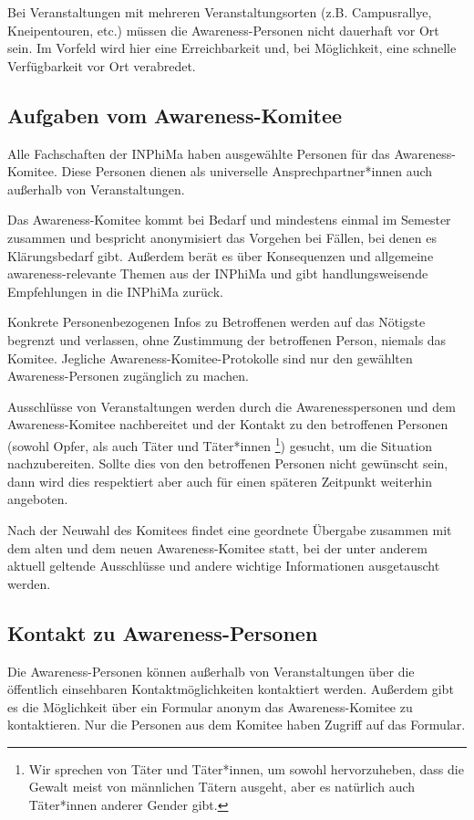 \documentclass{article}
\begin{document}
Bei Veranstaltungen mit mehreren Veranstaltungsorten (z.B. Campusrallye, Kneipentouren, etc.) müs\-sen die Awareness-Personen nicht dauerhaft vor Ort sein. Im Vorfeld wird hier eine Erreichbarkeit und, bei Möglichkeit, eine schnelle Verfügbarkeit vor Ort verabredet.  

\subsection{Aufgaben vom Awareness-Komitee}
Alle Fachschaften der INPhiMa haben ausgewählte Personen für das Awareness-Komitee. Diese Personen dienen als universelle Ansprechpartner*innen auch außerhalb von Veranstaltungen.

Das Awareness-Komitee kommt bei Bedarf und mindestens einmal im Semester zusammen und bespricht anonymisiert das Vorgehen bei Fällen, bei denen es Klärungsbedarf gibt. Außerdem berät es über Konsequenzen und allgemeine awareness-relevante Themen aus der INPhiMa und gibt handlungsweisende Empfehlungen in die INPhiMa zurück.  

Konkrete Personenbezogenen Infos zu Betroffenen werden auf das Nötigste begrenzt und verlassen, ohne Zustimmung der betroffenen Person, niemals das Komitee. Jegliche Awareness-Komitee-Protokolle sind nur den gewählten Awareness-Personen zugänglich zu machen.

Ausschlüsse von Veranstaltungen werden durch die Awarenesspersonen und dem Awareness-Komitee nachbereitet und der Kontakt zu den betroffenen Personen (sowohl Opfer, als auch Täter und Täter*innen \footnote{Wir sprechen von Täter und Täter*innen, um sowohl hervorzuheben, dass die Gewalt meist von männlichen Tätern ausgeht, aber es natürlich auch Täter*innen anderer Gender gibt.}) gesucht, um die Situation nachzubereiten. Sollte dies von den betroffenen Personen nicht gewünscht sein, dann wird dies respektiert aber auch für einen späteren Zeitpunkt weiterhin angeboten.

Nach der Neuwahl des Komitees findet eine geordnete Übergabe zusammen mit dem alten und dem neuen Awareness-Komitee statt, bei der unter anderem aktuell geltende Ausschlüsse und andere wichtige Informationen ausgetauscht werden.

\subsection{Kontakt zu Awareness-Personen}
Die Awareness-Personen können außerhalb von Veranstaltungen über die öffentlich einsehbaren Kontaktmöglichkeiten kontaktiert werden. %
Außerdem gibt es die Möglichkeit über ein Formular anonym das Awareness-Komitee zu kontaktieren. Nur die Personen aus dem Komitee haben Zugriff auf das Formular. %
\end{document}
